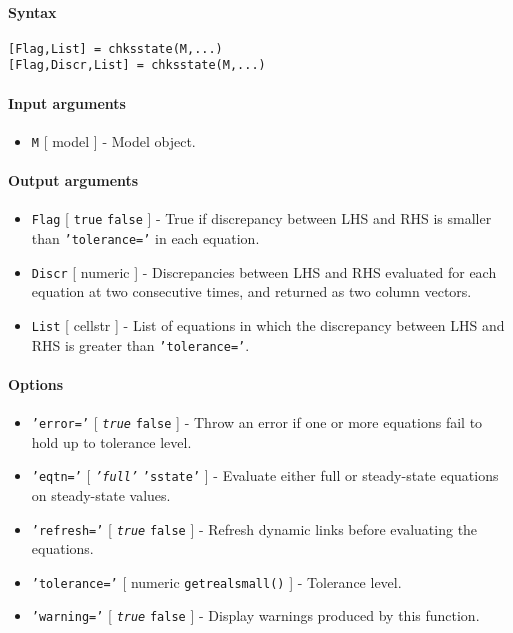 


	\paragraph{Syntax}

\begin{verbatim}
[Flag,List] = chksstate(M,...)
[Flag,Discr,List] = chksstate(M,...)
\end{verbatim}

\paragraph{Input arguments}

\begin{itemize}
\itemsep1pt\parskip0pt
\item
  \texttt{M} {[} model {]} - Model object.
\end{itemize}

\paragraph{Output arguments}

\begin{itemize}
\item
  \texttt{Flag} {[} \texttt{true} \textbar{} \texttt{false} {]} - True
  if discrepancy between LHS and RHS is smaller than
  \texttt{'tolerance='} in each equation.
\item
  \texttt{Discr} {[} numeric {]} - Discrepancies between LHS and RHS
  evaluated for each equation at two consecutive times, and returned as
  two column vectors.
\item
  \texttt{List} {[} cellstr {]} - List of equations in which the
  discrepancy between LHS and RHS is greater than \texttt{'tolerance='}.
\end{itemize}

\paragraph{Options}

\begin{itemize}
\item
  \texttt{'error='} {[} \emph{\texttt{true}} \textbar{} \texttt{false}
  {]} - Throw an error if one or more equations fail to hold up to
  tolerance level.
\item
  \texttt{'eqtn='} {[} \emph{\texttt{'full'}} \textbar{}
  \texttt{'sstate'} {]} - Evaluate either full or steady-state equations
  on steady-state values.
\item
  \texttt{'refresh='} {[} \emph{\texttt{true}} \textbar{} \texttt{false}
  {]} - Refresh dynamic links before evaluating the equations.
\item
  \texttt{'tolerance='} {[} numeric \textbar{} \texttt{getrealsmall()}
  {]} - Tolerance level.
\item
  \texttt{'warning='} {[} \emph{\texttt{true}} \textbar{} \texttt{false}
  {]} - Display warnings produced by this function.
\end{itemize}

